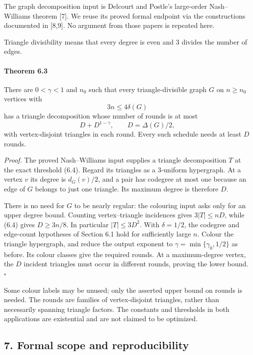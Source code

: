 \documentclass[english,11pt,a4paper]{article}
\begin{document}
The graph decomposition input is Delcourt and Postle's large-order Nash--Williams theorem {[}7{]}. We reuse its proved formal endpoint via the constructions documented in {[}8,9{]}. No argument from those papers is repeated here.

Triangle divisibility means that every degree is even and \(3\) divides the number of edges.

\par
\begin{samepage}
\paragraph{Theorem 6.3}\label{theorem-6.3}

There are \(0<\gamma<1\) and \(n_0\) such that every triangle-divisible graph \(G\) on \(n\ge n_0\) vertices with \[3n\le4\delta(G)
\tag{6.4}\] has a triangle decomposition whose number of rounds is at most \[D+D^{1-\gamma},\qquad D=\Delta(G)/2,
\tag{6.5}\] with vertex-disjoint triangles in each round. Every such schedule needs at least \(D\) rounds.

\end{samepage}
\emph{Proof.} The proved Nash--Williams input supplies a triangle decomposition \(T\) at the exact threshold (6.4). Regard its triangles as a \(3\)-uniform hypergraph. At a vertex \(v\) its degree is \(d_G(v)/2\), and a pair has codegree at most one because an edge of \(G\) belongs to just one triangle. Its maximum degree is therefore \(D\).

There is no need for \(G\) to be nearly regular: the colouring input asks only for an upper degree bound. Counting vertex--triangle incidences gives \(3|T|\le nD\), while (6.4) gives \(D\ge3n/8\). In particular \(|T|\le3D^2\). With \(\delta=1/2\), the codegree and edge-count hypotheses of Section 6.1 hold for sufficiently large \(n\). Colour the triangle hypergraph, and reduce the output exponent to \(\gamma=\min\{\gamma_0,1/2\}\) as before. Its colour classes give the required rounds. At a maximum-degree vertex, the \(D\) incident triangles must occur in different rounds, proving the lower bound. \(\square\)

Some colour labels may be unused; only the asserted upper bound on rounds is needed. The rounds are families of vertex-disjoint triangles, rather than necessarily spanning triangle factors. The constants and thresholds in both applications are existential and are not claimed to be optimized.

\subsection{7. Formal scope and reproducibility}\label{formal-scope-and-reproducibility}
\end{document}
